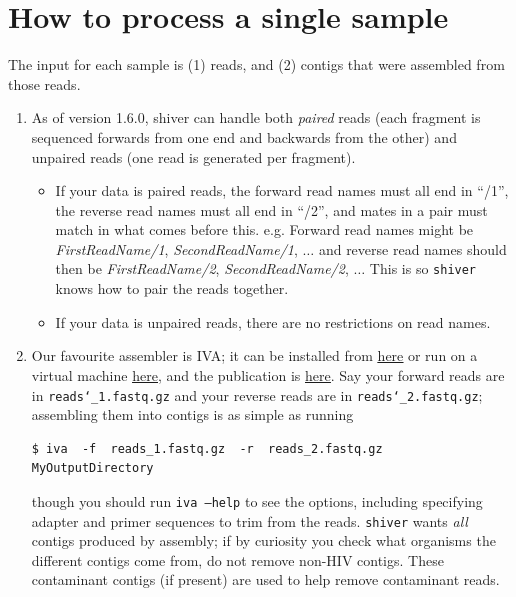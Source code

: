 \documentclass{article}
\newcommand{\shiv}{\c{shiver}\xspace}
\let\c\texttt
\newcommand{\www}{\color{blue} \underline}
\begin{document}
\section{How to process a single sample} \label{sec:SingleSample}

The input for each sample is (1) reads, and (2) contigs that were assembled from those reads.
\begin{enumerate}
\item As of version 1.6.0, shiver can handle both {\it paired} reads (each fragment is sequenced forwards from one end and backwards from the other) and unpaired reads (one read is generated per fragment).
\begin{itemize}
\item If your data is paired reads, the forward read names must all end in ``/1'', the reverse read names must all end in ``/2'', and mates in a pair must match in what comes before this.
e.g. Forward read names might be {\it FirstReadName/1}, {\it SecondReadName/1}, $\ldots$ and reverse read names should then be {\it FirstReadName/2}, {\it SecondReadName/2}, $\ldots$ This is so \shiv knows how to pair the reads together.
\item If your data is unpaired reads, there are no restrictions on read names.
\end{itemize}
\item Our favourite assembler is IVA; it can be installed from \href{http://sanger-pathogens.github.io/iva/}{\www{here}} or run on a virtual machine \href{http://sanger-pathogens.github.io/pathogens-vm/}{\www{here}}, and the publication is \href{http://bioinformatics.oxfordjournals.org/content/early/2015/02/27/bioinformatics.btv120.abstract}{\www{here}}.
Say your forward reads are in \c{reads\char`_1.fastq.gz} and your reverse reads are in \c{reads\char`_2.fastq.gz}; assembling them into contigs is as simple as running
\begin{Verbatim}[samepage=true]
$ iva  -f  reads_1.fastq.gz  -r  reads_2.fastq.gz  MyOutputDirectory
\end{Verbatim}
though you should run \c{iva --help} to see the options, including specifying adapter and primer sequences to trim from the reads.
\shiv wants {\it all} contigs produced by assembly; if by curiosity you check what organisms the different contigs come from, do not remove non-HIV contigs.
These contaminant contigs (if present) are used to help remove contaminant reads.
\end{enumerate}
\end{document}
